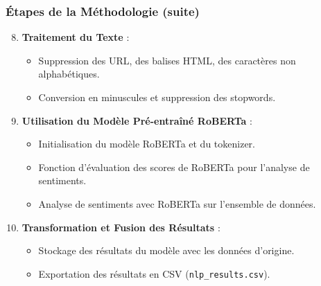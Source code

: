 \begin{frame}
    \frametitle{Étapes de la Méthodologie (suite)}

    \begin{enumerate}
        \setcounter{enumi}{7}
        \item \textbf{Traitement du Texte} :
            \begin{itemize}
                \item Suppression des URL, des balises HTML, des caractères non alphabétiques.
                \item Conversion en minuscules et suppression des stopwords.
            \end{itemize}
        \item \textbf{Utilisation du Modèle Pré-entraîné RoBERTa} :
            \begin{itemize}
                \item Initialisation du modèle RoBERTa et du tokenizer.
                \item Fonction d'évaluation des scores de RoBERTa pour l'analyse de sentiments.
                \item Analyse de sentiments avec RoBERTa sur l'ensemble de données.
            \end{itemize}
        \item \textbf{Transformation et Fusion des Résultats} :
            \begin{itemize}
                \item Stockage des résultats du modèle avec les données d'origine.
                \item Exportation des résultats en CSV (\texttt{nlp\_results.csv}).
            \end{itemize}
    \end{enumerate}
\end{frame}
